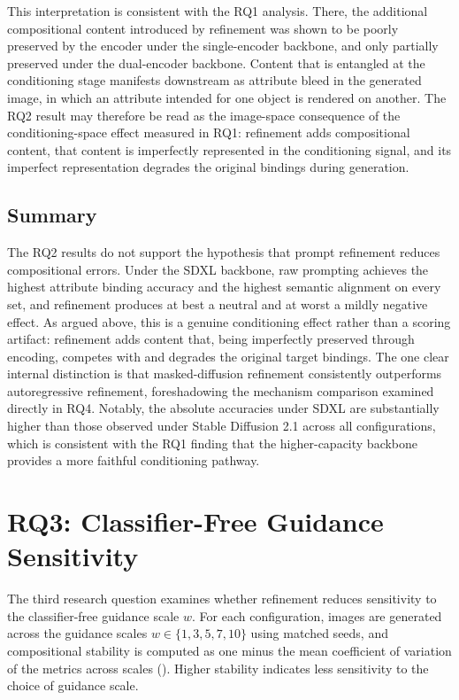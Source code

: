\documentclass[a4paper,twoside,12pt]{report}
\begin{document}
This interpretation is consistent with the RQ1 analysis. There, the additional
compositional content introduced by refinement was shown to be poorly preserved
by the encoder under the single-encoder backbone, and only partially preserved
under the dual-encoder backbone. Content that is entangled at the conditioning
stage manifests downstream as attribute bleed in the generated image, in which
an attribute intended for one object is rendered on another. The RQ2 result may
therefore be read as the image-space consequence of the conditioning-space
effect measured in RQ1: refinement adds compositional content, that content is
imperfectly represented in the conditioning signal, and its imperfect
representation degrades the original bindings during generation.

\subsection{Summary}

The RQ2 results do not support the hypothesis that prompt refinement reduces
compositional errors. Under the SDXL backbone, raw prompting achieves the
highest attribute binding accuracy and the highest semantic alignment on every
set, and refinement produces at best a neutral and at worst a mildly negative
effect. As argued above, this is a genuine conditioning effect rather than a
scoring artifact: refinement adds content that, being imperfectly preserved
through encoding, competes with and degrades the original target bindings. The
one clear internal distinction is that masked-diffusion refinement consistently
outperforms autoregressive refinement, foreshadowing the mechanism comparison
examined directly in RQ4. Notably, the absolute accuracies under SDXL are
substantially higher than those observed under Stable Diffusion 2.1 across all
configurations, which is consistent with the RQ1 finding that the
higher-capacity backbone provides a more faithful conditioning pathway.

\section{RQ3: Classifier-Free Guidance Sensitivity}
\label{sec:rq3}

The third research question examines whether refinement reduces sensitivity to
the classifier-free guidance scale \(w\). For each configuration, images are
generated across the guidance scales \(w \in \{1, 3, 5, 7, 10\}\) using matched
seeds, and compositional stability is computed as one minus the mean coefficient
of variation of the metrics across scales (). Higher stability
indicates less sensitivity to the choice of guidance scale.
\end{document}
